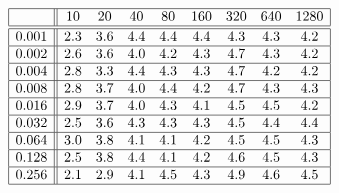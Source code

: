 \[
\begin{array}{|c||cccccccc|}
\hline 
& 10 & 20 & 40 & 80 & 160 & 320 & 640 & 1280\\
\hline \hline 
0.001 & 2.3 & 3.6 & 4.4 & 4.4 & 4.4 & 4.3 & 4.3 & 4.2 \\ \hline 
0.002 & 2.6 & 3.6 & 4.0 & 4.2 & 4.3 & 4.7 & 4.3 & 4.2 \\ \hline 
0.004 & 2.8 & 3.3 & 4.4 & 4.3 & 4.3 & 4.7 & 4.2 & 4.2 \\ \hline 
0.008 & 2.8 & 3.7 & 4.0 & 4.4 & 4.2 & 4.7 & 4.3 & 4.3 \\ \hline 
0.016 & 2.9 & 3.7 & 4.0 & 4.3 & 4.1 & 4.5 & 4.5 & 4.2 \\ \hline 
0.032 & 2.5 & 3.6 & 4.3 & 4.3 & 4.3 & 4.5 & 4.4 & 4.4 \\ \hline 
0.064 & 3.0 & 3.8 & 4.1 & 4.1 & 4.2 & 4.5 & 4.5 & 4.3 \\ \hline 
0.128 & 2.5 & 3.8 & 4.4 & 4.1 & 4.2 & 4.6 & 4.5 & 4.3 \\ \hline 
0.256 & 2.1 & 2.9 & 4.1 & 4.5 & 4.3 & 4.9 & 4.6 & 4.5 \\ \hline 
\end{array}
\]

